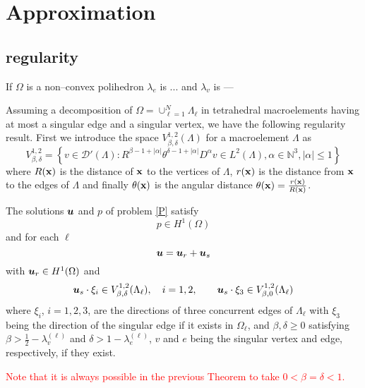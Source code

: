 \chapter{Approximation}
\section{regularity} %
\label{sec:regularity}
\begin{defi}
  If $\Omega$ is a non--convex polihedron $\lambda_e$ is ... and $\lambda_v$ is ---	
\end{defi}
\noindent Assuming a decomposition of $\Omega=\cup_{\ell=1}^N \Lambda_\ell$ in tetrahedral macroelements having at most a singular edge and a singular vertex, we have the following regularity result. First we introduce the space $V^{1,2}_{\beta,\delta}(\Lambda)$ for a macroelement $\Lambda$ as
\[
V^{1,2}_{\beta,\delta} = \left\{v\in \mathcal D'(\Lambda): R^{\beta-1+|\alpha|}\theta^{\delta-1+|\alpha|}D^\alpha v\in L^2(\Lambda), \alpha\in \mathbb N^3, |\alpha|\le1\right\}
\]
where $R({\bf x})$ is the distance of ${\bf x}$ to the vertices of $\Lambda$, $r({\bf x})$ is the distance from ${\bf x}$ to the edges of $\Lambda$ and finally $\theta({\bf x})$ is the angular distance $\theta({\bf x})=\frac{r({\bf x})}{R({\bf x})}$.
\begin{theorem}
The solutions $\boldsymbol{u}$ and $p$ of problem \eqref{P} satisfy
\[
p\in H^1(\Omega)
\] 
and for each $\ell$
\[
\boldsymbol{u}=\boldsymbol{u}_r + \boldsymbol{u}_s
\]
with $\boldsymbol{u}_r\in H^1(\Omega)$ and
\[
\boldsymbol{u}_s\cdot \xi_i\in V^{1,2}_{\beta,\delta}(\Lambda_\ell), \quad i=1,2, \qquad \boldsymbol{u}_s\cdot\xi_3\in V^{1,2}_{\beta,0}(\Lambda_\ell)
\]
where $\xi_i$, $i=1,2,3$, are the directions of three concurrent edges of $\Lambda_\ell$ with $\xi_3$ being the direction of the singular edge if it exists in $\Omega_\ell$, and $\beta,\delta\ge0$ satisfying $\beta>\frac12-\lambda_v^{(\ell)}$ and $\delta>1-\lambda_e^{(\ell)}$, $v$ and $e$ being the singular vertex and edge, respectively, if they exist.
\end{theorem} 

\begin{remark}\label{sobreBetaYDelta}
\textcolor{red}{Note that it is always possible in the previous Theorem to take $0<\beta=\delta<1$.} 
\end{remark}
